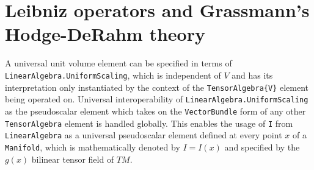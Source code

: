 \documentclass{juliacon}
\begin{document}

\newpage

\section{Leibniz operators and Grassmann's Hodge-DeRahm theory}

A universal unit volume element can be specified in terms of \verb`LinearAlgebra.UniformScaling`, which is independent of $V$ and has its interpretation only instantiated by the context of the \verb`TensorAlgebra{V}` element being operated on.
Universal interoperability of \verb`LinearAlgebra.UniformScaling` as the pseudoscalar element which takes on the \verb`VectorBundle` form of any other \verb`TensorAlgebra` element is handled globally.
This enables the usage of \verb`I` from \verb`LinearAlgebra` as a universal pseudoscalar element defined at every point $x$ of a \verb`Manifold`, which is mathematically denoted by $I=I(x)$ and specified by the $g(x)$ bilinear tensor field of $TM$.
\end{document}
